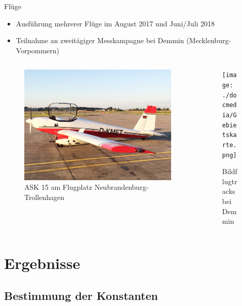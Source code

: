 \documentclass[ucs,9pt]{beamer}
\begin{document}
\begin{frame}{Flüge}
	\begin{itemize}
		\item Ausführung mehrerer Flüge im August 2017 und Juni/Juli 2018
		\item Teilnahme an zweitägiger Messkampagne bei Demmin (Mecklenburg-Vorpommern)
	\end{itemize}
	\begin{columns}
		\begin{column}{0.48\textwidth}
			\begin{figure}
				\includegraphics[width=\textwidth]{./docmedia/demmin_ready.jpg}
				\caption{ASK 15 am Flugplatz Neubrandenburg-Trollenhagen}
			\end{figure}
		\end{column}
		\begin{column}{0.48\textwidth}
			\begin{figure}
				\texttt{[image: ./docmedia/Gebietskarte.png]}
				\caption{Bildflugtracks bei Demmin}
			\end{figure}
		\end{column}
	\end{columns}
\end{frame}

\section{Ergebnisse}

\subsection{Bestimmung der Konstanten}
\end{document}
